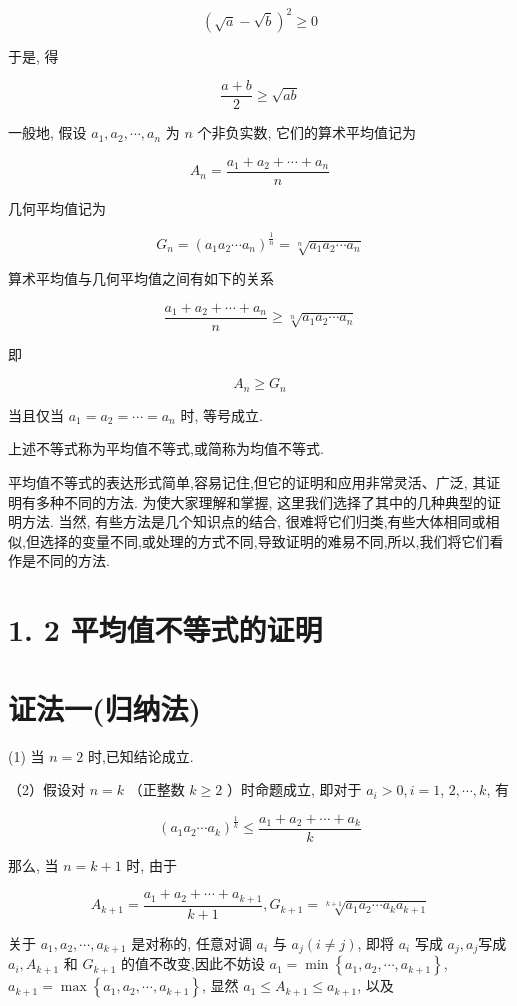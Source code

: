 $$
(\sqrt{a}-\sqrt{b})^{2} \geqslant 0
$$

于是, 得

$$
\frac{a+b}{2} \geqslant \sqrt{a b}
$$

一般地, 假设 $a_{1}, a_{2}, \cdots, a_{n}$ 为 $n$ 个非负实数, 它们的算术平均值记为

$$
A_{n}=\frac{a_{1}+a_{2}+\cdots+a_{n}}{n}
$$

几何平均值记为

$$
G_{n}=\left(a_{1} a_{2} \cdots a_{n}\right)^{\frac{1}{n}}=\sqrt[n]{a_{1} a_{2} \cdots a_{n}}
$$

算术平均值与几何平均值之间有如下的关系

$$
\frac{a_{1}+a_{2}+\cdots+a_{n}}{n} \geqslant \sqrt[n]{a_{1} a_{2} \cdots a_{n}}
$$

即

$$
A_{n} \geqslant G_{n}
$$

当且仅当 $a_{1}=a_{2}=\cdots=a_{n}$ 时, 等号成立.

上述不等式称为平均值不等式,或简称为均值不等式.

平均值不等式的表达形式简单,容易记住,但它的证明和应用非常灵活、广泛, 其证明有多种不同的方法. 为使大家理解和掌握, 这里我们选择了其中的几种典型的证明方法. 当然, 有些方法是几个知识点的结合, 很难将它们归类,有些大体相同或相似,但选择的变量不同,或处理的方式不同,导致证明的难易不同,所以,我们将它们看作是不同的方法.

\section*{1. 2 平均值不等式的证明}
\section*{证法一(归纳法)}
(1) 当 $n=2$ 时,已知结论成立.

（2）假设对 $n=k$ （正整数 $k \geqslant 2$ ）时命题成立, 即对于 $a_{i}>0, i=1$, $2, \cdots, k$, 有

$$
\left(a_{1} a_{2} \cdots a_{k}\right)^{\frac{1}{k}} \leqslant \frac{a_{1}+a_{2}+\cdots+a_{k}}{k}
$$

那么, 当 $n=k+1$ 时, 由于

$$
A_{k+1}=\frac{a_{1}+a_{2}+\cdots+a_{k+1}}{k+1}, G_{k+1}=\sqrt[k+1]{a_{1} a_{2} \cdots a_{k} a_{k+1}}
$$

关于 $a_{1}, a_{2}, \cdots, a_{k+1}$ 是对称的, 任意对调 $a_{i}$ 与 $a_{j}(i \neq j)$, 即将 $a_{i}$ 写成 $a_{j}, a_{j}$写成 $a_{i}, A_{k+1}$ 和 $G_{k+1}$ 的值不改变,因此不妨设 $a_{1}=\min \left\{a_{1}, a_{2}, \cdots, a_{k+1}\right\}$, $a_{k+1}=\max \left\{a_{1}, a_{2}, \cdots, a_{k+1}\right\}$, 显然 $a_{1} \leqslant A_{k+1} \leqslant a_{k+1}$, 以及

